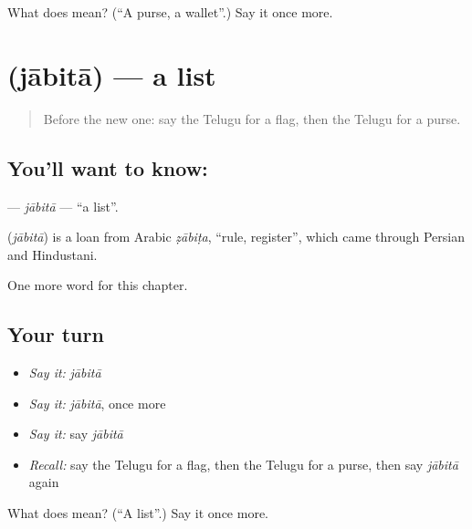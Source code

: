 \begin{tcolorbox}[breakable,colback=teal!4,colframe=teal!35!black,title={Before you move on}]
What does  mean? (\textquotedblleft{}A purse, a wallet\textquotedblright{}.) Say it once more.
\end{tcolorbox}
\section[\texorpdfstring{\te{జాబితా} (jābitā)}{జాబితా (jābitā)}]{ (jābitā) — a list}

\label{lesson:TE-C310-jabita}



\begin{quote}
Before the new one: say the Telugu for a flag, then the Telugu for a purse.
\end{quote}

\subsection*{You'll want to know: }
\textbf{} — \emph{jābitā} — \textquotedblleft{}a list\textquotedblright{}.

\begin{cousinweb}
\textbf{} (\emph{jābitā}) is a loan from Arabic \emph{ẓābiṭa}, \textquotedblleft{}rule, register\textquotedblright{}, which came through Persian and Hindustani.
\end{cousinweb}

\begin{grammarlens}[title={What you've built}]
One more word for this chapter.
\end{grammarlens}

\subsection*{Your turn}
\begin{itemize}
\raggedright
  \item \emph{Say it:} \emph{jābitā}
  \item \emph{Say it:} \emph{jābitā}, once more
  \item \emph{Say it:} say \emph{jābitā}
  \item \emph{Recall:} say the Telugu for a flag, then the Telugu for a purse, then say \emph{jābitā} again
\end{itemize}

\begin{tcolorbox}[breakable,colback=teal!4,colframe=teal!35!black,title={Before you move on}]
What does  mean? (\textquotedblleft{}A list\textquotedblright{}.) Say it once more.
\end{tcolorbox}
